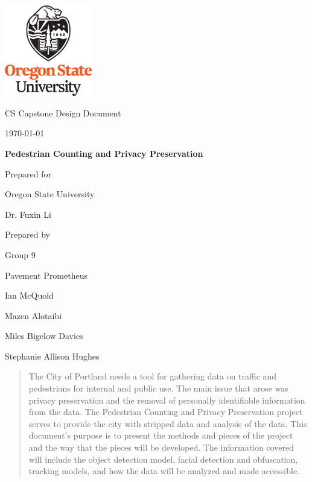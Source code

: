 \documentclass[onecolumn, draftclsnofoot,10pt, compsoc]{IEEEtran}
\def \CapstoneTeamName{		Pavement Prometheus}
\def \CapstoneTeamNumber{		9}
\def \GroupMemberOne{			Ian McQuoid  }
\def \GroupMemberTwo{			Mazen Alotaibi }
\def \GroupMemberThree{			Miles Bigelow Davies  }
\def \GroupMemberFour{			Stephanie Allison Hughes }
\def \CapstoneProjectName{		Pedestrian Counting and Privacy Preservation}
\def \CapstoneSponsorCompany{	Oregon State University}
\def \CapstoneSponsorPerson{		Dr. Fuxin Li}
\def \DocType{		%
				Design Document
				}
\newcommand{\NameSigPair}[1]{\par
\makebox[2.75in][r]{#1} \hfil 	\makebox[3.25in]{\makebox[2.25in]{\hrulefill} \hfill		\makebox[.75in]{\hrulefill}}
\par\vspace{-12pt} \textit{\tiny\noindent
\makebox[2.75in]{} \hfil		\makebox[3.25in]{\makebox[2.25in][r]{Signature} \hfill	\makebox[.75in][r]{Date}}}}
\renewcommand{\NameSigPair}[1]{#1}
\begin{document}
\begin{titlepage}
    \begin{singlespace}
    	\includegraphics[height=4cm]{coe_v_spot1}
        \hfill 
        \par\vspace{.2in}
        \centering
        \scshape{
            \huge CS Capstone \DocType \par
            {\large\today}\par
            \vspace{.5in}
            \textbf{\Huge\CapstoneProjectName}\par
            {\large Prepared for}\par
            \Huge \CapstoneSponsorCompany\par
            \vspace{5pt}
            {\Large\NameSigPair{\CapstoneSponsorPerson}\par}
            {\large Prepared by }\par
            Group\CapstoneTeamNumber\par
            \CapstoneTeamName\par 
            \vspace{5pt}
            {\Large
                \NameSigPair{\GroupMemberOne}\par
                \NameSigPair{\GroupMemberTwo}\par
                \NameSigPair{\GroupMemberThree}\par
                \NameSigPair{\GroupMemberFour}\par
            }
            \vspace{20pt}
        }
        \begin{abstract}
        The City of Portland needs a tool for gathering data on traffic and pedestrians for internal and public use. The main issue that arose was privacy preservation and the removal of personally identifiable information from the data. The Pedestrian Counting and Privacy Preservation project serves to provide the city with stripped data and analysis of the data. This document's purpose is to present the methods and pieces of the project and the way that the pieces will be developed. The information covered will include the object detection model, facial detection and obfuscation, tracking models, and how the data will be analyzed and made accessible. 
        \end{abstract}     
    \end{singlespace}
\end{titlepage}
\end{document}
